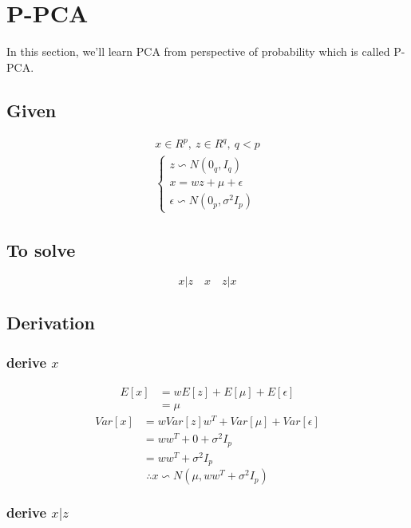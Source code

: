 \documentclass{report}
\begin{document}
\section{P-PCA}
In this section, we'll learn PCA from perspective of probability which is called P-PCA.

\subsection{Given}
$$
\begin{aligned}
x \in R^p, \ z \in R^q, \ q < p\\
\begin{cases}
z \backsim N(0_q, I_q)\\
x = wz + \mu + \epsilon\\
\epsilon \backsim N(0_p, \sigma^2 I_p)
\end{cases}
\end{aligned}
$$
\subsection{To solve}
$$
x|z \quad x \quad z|x
$$
\subsection{Derivation}
\subsubsection{derive $x$}
\begin{equation}
\begin{aligned}
E[x]
&= w E[z] + E[\mu] + E[\epsilon]\\
&=\mu
\end{aligned}
\end{equation}
\begin{equation}
\begin{aligned}
Var[x] &= w Var[z] w^T + Var[\mu] + Var[\epsilon]\\
&=ww^T + 0 + \sigma^2 I_p\\
&=ww^T + \sigma^2 I_p
\end{aligned}
\end{equation}
$$
\therefore x \backsim N(\mu, ww^T + \sigma^2 I_p)
$$
\subsubsection{derive $x|z$}
\end{document}
